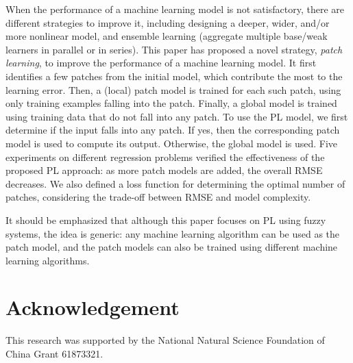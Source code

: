 \documentclass[journal,twocolumn]{IEEEtran}
\begin{document}
When the performance of a machine learning model is not satisfactory, there are different strategies to improve it, including designing a deeper, wider, and/or more nonlinear model, and ensemble learning (aggregate multiple base/weak learners in parallel or in series). This paper has proposed a novel strategy, \emph{patch learning}, to improve the performance of a machine learning model. It first identifies a few patches from the initial model, which contribute the most to the learning error. Then, a (local) patch model is trained for each such patch, using only training examples falling into the patch. Finally, a global model is trained using training data that do not fall into any patch. To use the PL model, we first determine if the input falls into any patch. If yes, then the corresponding patch model is used to compute its output. Otherwise, the global model is used. Five experiments on different regression problems verified the effectiveness of the proposed PL approach: as more patch models are added, the overall RMSE decreases. We also defined a loss function for determining the optimal number of patches, considering the trade-off between RMSE and model complexity.

It should be emphasized that although this paper focuses on PL using fuzzy systems, the idea is generic: any machine learning algorithm can be used as the patch model, and the patch models can also be trained using different machine learning algorithms.


\section*{Acknowledgement}
This research was supported by the National Natural Science Foundation of China Grant 61873321.




\end{document}
